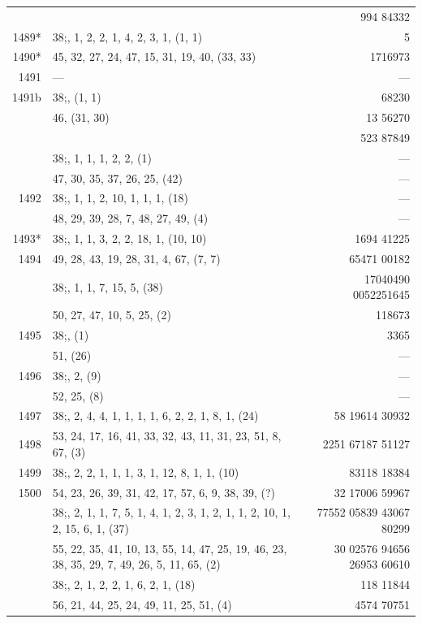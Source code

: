 \documentclass[11pt]{article}
\begin{document}
{\begin{longtable}{|r|p{8.5cm}|r|}
       & & 994 84332 \\
1489*  & $38$;\; 1, 1, 2, 2, 1, 4, 2, 3, 1, (1, 1) & 5 \\
1490*  & 45, 32, 27, 24, 47, 15, 31, 19, 40, (33, 33) & 1716973 \\
1491   & --- & --- \\
\hline
1491b  & $38$;\; 1, (1, 1) & 68230 \\
       & 46, (31, 30) & 13 56270 \\
       & & 523 87849 \\
       & $38$;\; 1, 1, 1, 1, 2, 2, (1) & --- \\
       & 47, 30, 35, 37, 26, 25, (42) & --- \\
\hline
1492   & $38$;\; 1, 1, 1, 2, 10, 1, 1, 1, (18) & --- \\
       & 48, 29, 39, 28, 7, 48, 27, 49, (4) & --- \\
\hline
1493*  & $38$;\; 1, 1, 1, 3, 2, 2, 18, 1, (10, 10) & 1694 41225 \\
1494   & 49, 28, 43, 19, 28, 31, 4, 67, (7, 7) & 65471 00182 \\
\hline
       & $38$;\; 1, 1, 1, 7, 15, 5, (38) & 17040490 0052251645 \\
       & 50, 27, 47, 10, 5, 25, (2) & 118673 \\
\hline
1495   & $38$;\; 1, (1) & 3365 \\
       & 51, (26) & --- \\
\hline
1496   & $38$;\; 1, 2, (9) & --- \\
       & 52, 25, (8) & --- \\
\hline
1497   & $38$;\; 1, 2, 4, 4, 1, 1, 1, 1, 6, 2, 2, 1, 8, 1, (24) & 58 19614 30932 \\
1498   & 53, 24, 17, 16, 41, 33, 32, 43, 11, 31, 23, 51, 8, 67, (3) & 2251 67187 51127 \\
\hline
1499   & $38$;\; 1, 2, 2, 1, 1, 1, 3, 1, 12, 8, 1, 1, (10) & 83118 18384 \\
1500   & 54, 23, 26, 39, 31, 42, 17, 57, 6, 9, 38, 39, (?) & 32 17006 59967 \\
\hline
       & $38$;\; 1, 2, 1, 1, 7, 5, 1, 4, 1, 2, 3, 1, 2, 1, 1, 2, 10, 1, 2, 15, 6, 1, (37) & 77552 05839 43067 80299 \\
       & 55, 22, 35, 41, 10, 13, 55, 14, 47, 25, 19, 46, 23, 38, 35, 29, 7, 49, 26, 5, 11, 65, (2) & 30 02576 94656 26953 60610 \\
\hline
       & $38$;\; 1, 2, 1, 2, 2, 1, 6, 2, 1, (18) & 118 11844 \\
       & 56, 21, 44, 25, 24, 49, 11, 25, 51, (4) & 4574 70751 \\
\hline
\end{longtable}
}
\end{document}
